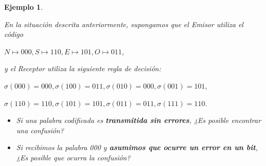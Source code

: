 \documentclass{beamer}
\theoremstyle{plain}
\theoremstyle{example}
\theoremstyle{example}
\newtheorem{ejemplo} [Ejemplo] {Ejemplo}
\begin{document}
\begin{frame}  \small 

\begin{ejemplo}\label{ej:Robot1}

En la situación descrita anteriormente, supongamos que el Emisor utiliza el código

\begin{center}
$N \mapsto 000, S \mapsto 110, E \mapsto 101, O \mapsto 011$,
\end{center}

y el Receptor utiliza la siguiente regla de decisión:

\begin{center}
$\sigma(000) = 000,	\sigma(100) = 011,	\sigma(010) = 000,	\sigma(001) = 101,$
\end{center}
\begin{center}
$\sigma(110) = 110,	\sigma(101) = 101,	\sigma(011) = 011,	\sigma(111) = 110.$
\end{center}

\begin{itemize}
    \item Si una palabra codificada es \textbf{transmitida sin errores}, ¿Es posible encontrar una confusión? 

    \item Si recibimos la palabra 000 y \textbf{asumimos que ocurre un error en un bit}, ¿Es posible que ocurra la confusión?
\end{itemize}

\end{ejemplo}

\end{frame} 
\end{document}
